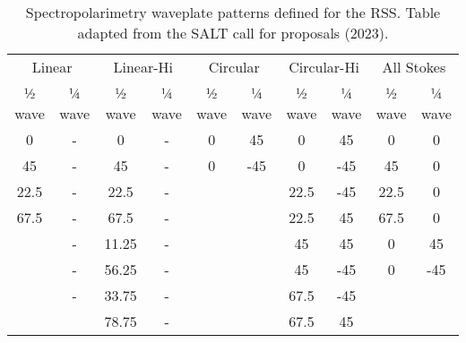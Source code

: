 \begin{table}[t]
    \begin{tabular}{cccccccccc}
        \hline
        \multicolumn{2}{c}{Linear} & \multicolumn{2}{c}{Linear-Hi} & \multicolumn{2}{c}{Circular} & \multicolumn{2}{c}{Circular-Hi} & \multicolumn{2}{c}{All Stokes}                                              \\
        ½ wave                     & ¼ wave                        & ½ wave                       & ¼ wave                          & ½ wave                         & ¼ wave & ½ wave & ¼ wave & ½ wave & ¼ wave \\ \hline
        0                          & -                             & 0                            & -                               & 0                              & 45     & 0      & 45     & 0      & 0      \\
        45                         & -                             & 45                           & -                               & 0                              & -45    & 0      & -45    & 45     & 0      \\
        22.5                       & -                             & 22.5                         & -                               &                                &        & 22.5   & -45    & 22.5   & 0      \\
        67.5                       & -                             & 67.5                         & -                               &                                &        & 22.5   & 45     & 67.5   & 0      \\
                                   & -                             & 11.25                        & -                               &                                &        & 45     & 45     & 0      & 45     \\
                                   & -                             & 56.25                        & -                               &                                &        & 45     & -45    & 0      & -45    \\
                                   & -                             & 33.75                        & -                               &                                &        & 67.5   & -45    &        &        \\
                                   &                               & 78.75                        & -                               &                                &        & 67.5   & 45     &        &        \\ \hline
    \end{tabular}
    \caption{Spectropolarimetry waveplate patterns defined for the \gls{RSS}. Table adapted from the \gls{SALT} call for proposals (2023).}
    \label{table:RSS_specpol_patterns}
\end{table}